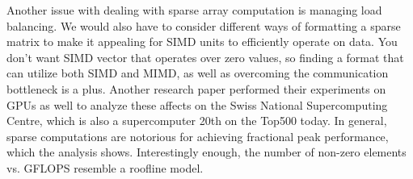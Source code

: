 \documentclass[11pt]{article}
\begin{document}
Another issue with dealing with sparse array computation is managing load balancing. \cite{10.1145/3149704.3149767} We would also have to consider different ways of formatting a sparse matrix to make it appealing for SIMD units to efficiently operate on data. You don't want SIMD vector that operates over zero values, so finding a format that can utilize both SIMD and MIMD, as well as overcoming the communication bottleneck is a plus. Another research paper performed their experiments on GPUs as well to analyze these affects on the Swiss National Supercomputing Centre, which is also a supercomputer 20th on the Top500 today. In general, sparse computations are notorious for achieving fractional peak performance, which the analysis shows. Interestingly enough, the number of non-zero elements vs. GFLOPS resemble a roofline model.



\end{document}

